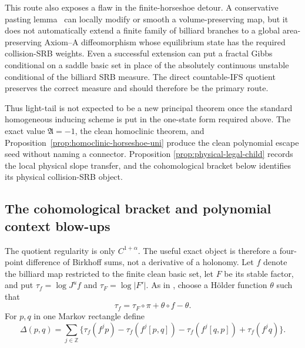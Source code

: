 \documentclass[11pt]{article}
\begin{document}
This route also exposes a flaw in the finite-horseshoe detour.  A conservative
pasting lemma~\cite{Teixeira} can locally modify or smooth a volume-preserving map, but it
does not automatically extend a finite family of billiard branches to a
global area-preserving Axiom--A diffeomorphism whose equilibrium state has the
required collision-SRB weights.  Even a successful extension can put a
fractal Gibbs conditional on a saddle basic set in place of the absolutely
continuous unstable conditional of the billiard SRB measure.  The direct
countable-IFS quotient preserves the correct measure and should therefore be
the primary route.

Thus light-tail is not expected to be a new principal theorem once the
standard homogeneous inducing scheme is put in the one-state form required
above.  The exact value $\mathfrak A=-1$, the clean homoclinic theorem, and
Proposition~\ref{prop:homoclinic-horseshoe-uni} produce the clean polynomial
escape seed without naming a connector.  Proposition
\ref{prop:physical-legal-child} records the local physical slope transfer, and
the cohomological bracket below identifies its physical collision-SRB object.

\subsection{The cohomological bracket and polynomial context blow-ups}

The quotient regularity is only $C^{1+\alpha}$.  The useful exact object is
therefore a four-point difference of Birkhoff sums, not a derivative of a
holonomy.  Let $f$ denote the billiard map restricted to the finite clean
basic set, let $F$ be its stable factor, and put
$\tau_f=\log J^uf$ and $\tau_F=\log|F'|$.  As in
\cite[Lemma~3.15]{Leclerc2026}, choose a H\"older function $\theta$ such that
\begin{equation}
\label{eq:potential-cohomology}
 \tau_f=\tau_F\circ\pi+\theta\circ f-\theta .
\end{equation}
For $p,q$ in one Markov rectangle define
\begin{equation}
\label{eq:physical-temporal-bracket}
 \Delta(p,q)=\sum_{j\in\mathbb Z}
 \{\tau_f(f^jp)-\tau_f(f^j[p,q])
   -\tau_f(f^j[q,p])+\tau_f(f^jq)\}.
\end{equation}
\end{document}
